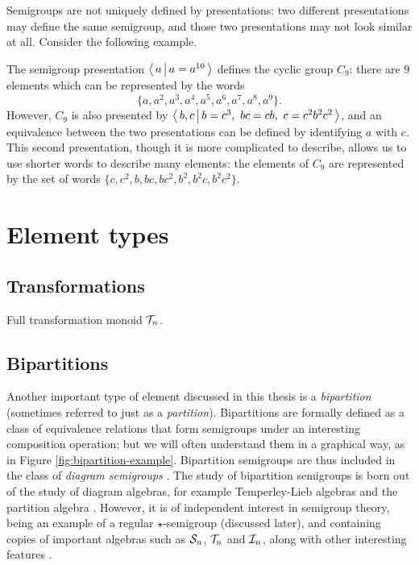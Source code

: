 Semigroups are not uniquely defined by presentations: two different
presentations may define the same semigroup, and those two presentations may not
look similar at all.  Consider the following example.

\begin{example}
  The semigroup presentation $\left\langle\,a\,\middle|\,a=a^{10}\,\right\rangle$ defines the cyclic group
  $C_9$: there are $9$ elements which can be represented by the words
  $$\{a, a^2, a^3, a^4, a^5, a^6, a^7, a^8, a^9\}.$$  However, $C_9$ is also
  presented by $\pres{b,c}{b=c^3,\ bc=cb,\ c=c^2b^2c^2}$, and an equivalence
  between the two presentations can be defined by identifying $a$ with $c$.
  This second presentation, though it is more complicated to describe, allows us
  to use shorter words to describe many elements: the elements of $C_9$ are
  represented by the set of words $\{c, c^2, b, bc, bc^2, b^2, b^2c, b^2c^2\}$.
\end{example}

\section{Element types}
\label{sec:element-types}

\subsection{Transformations}
\label{sec:transformations}

\begin{definition}
  \label{def:tn}
  Full transformation monoid $\mathcal{T}_n$.
\end{definition}



\subsection{Bipartitions}
\label{sec:bipartitions}

Another important type of element discussed in this thesis is a
\textit{bipartition} (sometimes referred to just as a \textit{partition}).
Bipartitions are formally defined as a class of equivalence relations that form
semigroups under an interesting composition operation; but we will often
understand them in a graphical way, as in Figure \ref{fig:bipartition-example}.
Bipartition semigroups are thus included in the class of \textit{diagram
  semigroups} \cite{diagram_semigroups}.  The study of bipartition semigroups is
born out of the study of diagram algebras, for example Temperley-Lieb algebras
and the partition algebra \cite{partition_algebra}.  However, it is of
independent interest in semigroup theory, being an example of a regular
$\star$-semigroup (discussed later), and containing copies of important algebras
such as $\mathcal{S}_n$, $\mathcal{T}_n$ and $\mathcal{I}_n$, along with other interesting features
\cite[\S1]{deg_motzkin}.


